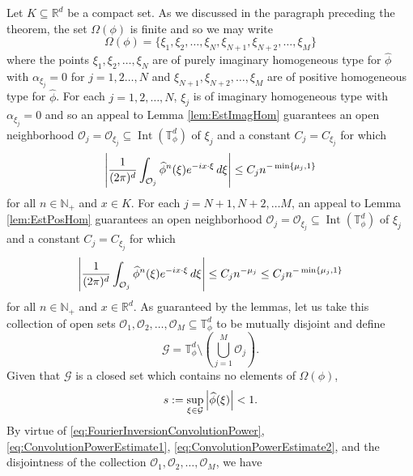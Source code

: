 \documentclass[smallextended]{svjour3}
\theoremstyle{remark}
\renewenvironment{proof}[1][\proofname]{\renewcommand\xproofname{#1}\xproof}{\endxproof}
\newcommand\Interior{\operatorname{Int}}
\begin{document}
\begin{proof}[Proof of Theorem \ref{thm:ConvolutionPowerEstimate}]
Let $K\subseteq\mathbb{R}^d$ be a compact set. As we discussed in the paragraph preceding the theorem, the set $\Omega(\phi)$ is finite and so we may write
\begin{equation*}
    \Omega(\phi)=\{\xi_1,\xi_2,\dots,\xi_N,\xi_{N+1},\xi_{N+2},\dots,\xi_M\}
\end{equation*}
where the points $\xi_1,\xi_2,\dots,\xi_N$ are of purely imaginary homogeneous type for $\widehat{\phi}$ with $\alpha_{\xi_j}=0$ for $j=1,2\dots,N$ and $\xi_{N+1},\xi_{N+2},\dots,\xi_M$ are of positive homogeneous type for $\widehat{\phi}$. For each $j=1,2,\dots,N$, $\xi_j$ is of imaginary homogeneous type with $\alpha_{\xi_j}=0$ and so an appeal to Lemma \ref{lem:EstImagHom} guarantees an open neighborhood $\mathcal{O}_j=\mathcal{O}_{\xi_j}\subseteq\Interior(\mathbb{T}_\phi^d)$ of $\xi_j$ and a constant $C_j=C_{\xi_j}$ for which
\begin{equation}\label{eq:ConvolutionPowerEstimate1}
    \abs{\frac{1}{(2\pi)^d}\int_{\mathcal{O}_j}\widehat{\phi}^n(\xi)e^{-ix\cdot\xi}\,d\xi}\leq C_j n^{-\min\{\mu_j,1\}}
\end{equation}
for all $n\in\mathbb{N}_+$ and $x\in K$. For each $j=N+1,N+2,\dots M$, an appeal to Lemma \ref{lem:EstPosHom} guarantees an open neighborhood $\mathcal{O}_j=\mathcal{O}_{\xi_j}\subseteq\Interior(\mathbb{T}_\phi^d)$ of $\xi_j$ and a constant $C_j=C_{\xi_j}$ for which 
\begin{equation}\label{eq:ConvolutionPowerEstimate2}
        \abs{\frac{1}{(2\pi)^d}\int_{\mathcal{O}_j}\widehat{\phi}^n(\xi)e^{-ix\cdot\xi}\,d\xi}\leq C_jn^{-\mu_j}\leq C_j n^{-\min\{\mu_j,1\}}
\end{equation}
for all $n\in\mathbb{N}_+$ and $x\in\mathbb{R}^d$. As guaranteed by the lemmas, let us take this collection of open sets $\mathcal{O}_1,\mathcal{O}_2,\dots,\mathcal{O}_M\subseteq\mathbb{T}_{\phi}^d$ to be mutually disjoint and define
\begin{equation}
    \mathcal{G}=\mathbb{T}_{\phi}^d\setminus\left(\bigcup_{j=1}^M \mathcal{O}_j\right).
\end{equation}
Given that $\mathcal{G}$ is a closed set which contains no elements of $\Omega(\phi)$,
\begin{equation*}
s:=\sup_{\xi\in\mathcal{G}}\abs{\widehat{\phi}(\xi)}<1.
\end{equation*}
By virtue of \eqref{eq:FourierInversionConvolutionPower}, \eqref{eq:ConvolutionPowerEstimate1}, \eqref{eq:ConvolutionPowerEstimate2}, and the disjointness of the collection $\mathcal{O}_1,\mathcal{O}_2,\dots,\mathcal{O}_M$, we have

\end{proof}
\end{document}
